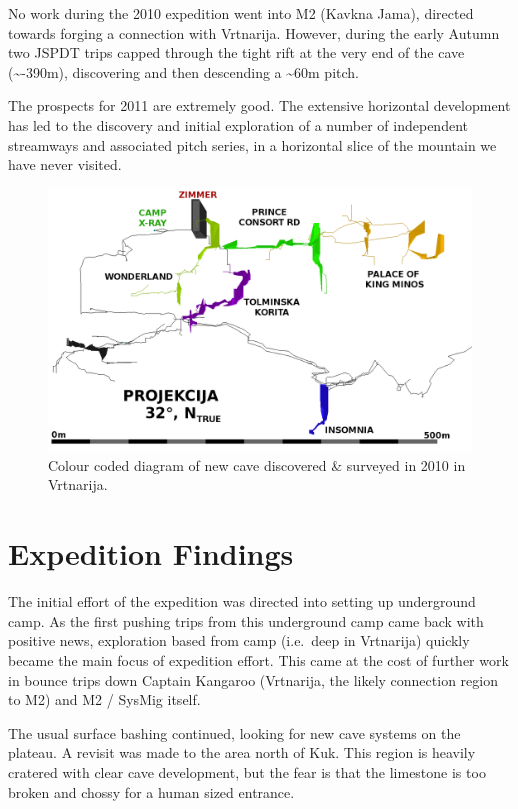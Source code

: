 No work during the 2010 expedition went into M2 (Kavkna Jama), directed
towards forging a connection with Vrtnarija. However, during the early
Autumn two JSPDT trips capped through the tight rift at the very end of
the cave (\textasciitilde{}-390m), discovering and then descending a
\textasciitilde{}60m pitch.

The prospects for 2011 are extremely good. The extensive horizontal
development has led to the discovery and initial exploration of a number
of independent streamways and associated pitch series, in a horizontal
slice of the mountain we have never visited.

\begin{figure}
\includegraphics[width=0.85\columnwidth]{2010/2010_deep_vrtnarija_colour_coded_inverted_labelled}
\caption{Colour coded diagram of new cave discovered \& surveyed in 2010 in
Vrtnarija.}
\end{figure}

\section{Expedition Findings}

The initial effort of the expedition was directed into setting up
underground camp. As the first pushing trips from this underground camp
came back with positive news, exploration based from camp (i.e.~deep in
Vrtnarija) quickly became the main focus of expedition effort. This came
at the cost of further work in bounce trips down Captain Kangaroo
(Vrtnarija, the likely connection region to M2) and M2 / SysMig itself.

The usual surface bashing continued, looking for new cave systems on the
plateau. A revisit was made to the area north of Kuk. This region is
heavily cratered with clear cave development, but the fear is that the
limestone is too broken and chossy for a human sized entrance.

